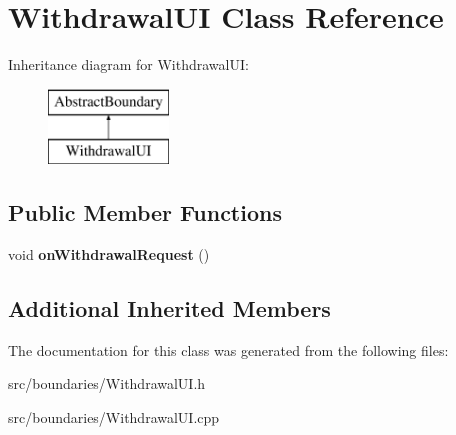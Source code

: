\hypertarget{class_withdrawal_u_i}{}\section{Withdrawal\+UI Class Reference}
\label{class_withdrawal_u_i}
Inheritance diagram for Withdrawal\+UI\+:\begin{figure}[H]
\begin{center}
\leavevmode
\includegraphics[height=2.000000cm]{class_withdrawal_u_i}
\end{center}
\end{figure}
\subsection*{Public Member Functions}
\begin{DoxyCompactItemize}
\item 
\mbox{\label{class_withdrawal_u_i_a3d555adf9eac49498001d9bed12bdbfe}} 
void {\bfseries on\+Withdrawal\+Request} ()
\end{DoxyCompactItemize}
\subsection*{Additional Inherited Members}


The documentation for this class was generated from the following files\+:\begin{DoxyCompactItemize}
\item 
src/boundaries/Withdrawal\+U\+I.\+h\item 
src/boundaries/Withdrawal\+U\+I.\+cpp\end{DoxyCompactItemize}
